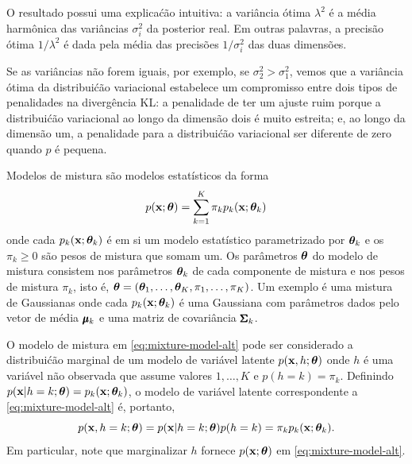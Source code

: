 \begin{exenumerate}
\begin{solution}
        O resultado possui uma explica\'c\~ao intuitiva: a vari\^ancia \'otima
        $\lambda^2$ \'e a m\'edia harm\^onica das vari\^ancias $\sigma_i^2$ da
        posterior real. Em outras palavras, a precis\~ao \'otima
        $1/\lambda^2$ \'e dada pela m\'edia das precis\~oes
        $1/\sigma_i^2$ das duas dimens\~oes.
        
        Se as vari\^ancias n\~ao forem iguais, por exemplo, se $\sigma_2^2 >
        \sigma_1^2$, vemos que a vari\^ancia \'otima da distribui\'c\~ao variacional
        estabelece um compromisso entre dois tipos de penalidades na diverg\^encia KL: a penalidade de ter um ajuste ruim porque a
        distribui\'c\~ao variacional ao longo da dimens\~ao dois \'e muito estreita; e, ao longo da dimens\~ao um, a penalidade para a distribui\'c\~ao variacional ser diferente de zero quando $p$ \'e pequena. 
        
    \end{solution}
    
\end{exenumerate}


\label{ex:EM-mixture-models-alt}
Modelos de mistura s\~ao modelos estat\'isticos da forma
\begin{equation}
    p(\mathbf{x}; \boldsymbol{\theta}) = \sum_{k=1}^K \pi_k p_k(\mathbf{x}; \boldsymbol{\theta}_k)
    \label{eq:mixture-model-alt}
\end{equation}
onde cada $p_k(\mathbf{x}; \boldsymbol{\theta}_k)$ \'e em si um modelo estat\'istico parametrizado por
$\boldsymbol{\theta}_k$ e os $\pi_k \ge 0$ s\~ao pesos de mistura que somam um. Os
par\^ametros $\boldsymbol{\theta}$ do modelo de mistura consistem nos par\^ametros $\boldsymbol{\theta}_k$
de cada componente de mistura e nos pesos de mistura $\pi_k$, isto \'e, $\boldsymbol{\theta} =
(\boldsymbol{\theta}_1, \ldots, \boldsymbol{\theta}_K, \pi_1, \ldots, \pi_K)$. Um exemplo \'e uma mistura
de Gaussianas onde cada $p_k(\mathbf{x}; \boldsymbol{\theta}_k)$ \'e uma Gaussiana com par\^ametros dados
pelo vetor de m\'edia $\pmb{\mu}_k$ e uma matriz de covari\^ancia $\pmb{\Sigma}_k$.

O modelo de mistura em \eqref{eq:mixture-model-alt} pode ser considerado a
distribui\'c\~ao marginal de um modelo de vari\'avel latente $p(\mathbf{x}, h; \boldsymbol{\theta})$ onde $h$
\'e uma vari\'avel n\~ao observada que assume valores $1, \ldots, K$ e $p(h=k) =
\pi_k$. Definindo $p(\mathbf{x}|h=k; \boldsymbol{\theta}) = p_k(\mathbf{x}; \boldsymbol{\theta}_k)$, o modelo de vari\'avel
latente correspondente a \eqref{eq:mixture-model-alt} \'e, portanto,
\begin{equation}
    p(\mathbf{x}, h=k; \boldsymbol{\theta}) = p(\mathbf{x}|h=k; \boldsymbol{\theta})p(h=k) = \pi_k p_k(\mathbf{x}; \boldsymbol{\theta}_k).
    \label{eq:latent-var-model-long-alt}
\end{equation}
Em particular, note que marginalizar $h$ fornece $p(\mathbf{x}; \boldsymbol{\theta})$ em
\eqref{eq:mixture-model-alt}.



